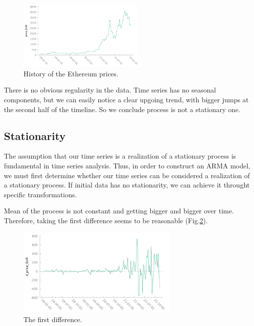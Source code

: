 \documentclass[14pt,a4paper]{extarticle}
\newcounter{e}
\newcounter{tabl}
\numberwithin{equation}{section}
\numberwithin{figure}{section}
\begin{document}
\begin{figure}[h]
	\hspace{-1.5cm}
	\centering
	\includegraphics[width=0.55\textwidth]{resources/raw_data}
	\caption{History of the Ethereum prices.}
	\label{fig:raw_data}
\end{figure}
There is no obvious regularity in the data. Time series has no seasonal components, but we can easily notice a clear upgoing trend, with bigger jumps at the second half of the timeline. So we conclude process is not a stationary one. 

\subsection{Stationarity}
The assumption that our time series is a realization of a
stationary process is fundamental in time series
analysis. Thus, in order to construct an ARMA model, we must first
determine whether our time series can be considered a
realization of a stationary process.
If initial data has no stationarity, we can achieve it throught specific transformations.

Mean of the process is not constant and getting bigger and bigger over time. Therefore, taking the first difference seems to be reasonable (Fig.\ref{fig:first_difference}).
\begin{figure}[h]
	\hspace{-1.5cm}
	\centering
	\includegraphics[width=0.7\textwidth]{resources/first_difference.pdf}
	\caption{The first difference.}
	\label{fig:first_difference}
\end{figure}
\end{document}
